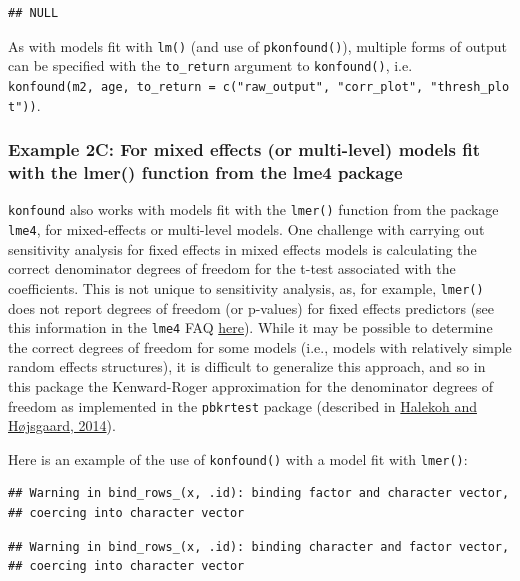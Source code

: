 \documentclass[man]{apa6}
\theoremstyle{definition}
\theoremstyle{definition}
\theoremstyle{definition}
\theoremstyle{remark}
\begin{document}
\begin{verbatim}
## NULL
\end{verbatim}

As with models fit with \texttt{lm()} (and use of \texttt{pkonfound()}),
multiple forms of output can be specified with the \texttt{to\_return}
argument to \texttt{konfound()}, i.e.
\texttt{konfound(m2,\ age,\ to\_return\ =\ c("raw\_output",\ "corr\_plot",\ "thresh\_plot"))}.

\subsubsection{Example 2C: For mixed effects (or multi-level) models fit
with the lmer() function from the lme4
package}\label{example-2c-for-mixed-effects-or-multi-level-models-fit-with-the-lmer-function-from-the-lme4-package}

\texttt{konfound} also works with models fit with the \texttt{lmer()}
function from the package \texttt{lme4}, for mixed-effects or
multi-level models. One challenge with carrying out sensitivity analysis
for fixed effects in mixed effects models is calculating the correct
denominator degrees of freedom for the t-test associated with the
coefficients. This is not unique to sensitivity analysis, as, for
example, \texttt{lmer()} does not report degrees of freedom (or
p-values) for fixed effects predictors (see this information in the
\texttt{lme4} FAQ
\href{http://bbolker.github.io/mixedmodels-misc/glmmFAQ.html\#why-doesnt-lme4-display-denominator-degrees-of-freedomp-values-what-other-options-do-i-have}{here}).
While it may be possible to determine the correct degrees of freedom for
some models (i.e., models with relatively simple random effects
structures), it is difficult to generalize this approach, and so in this
package the Kenward-Roger approximation for the denominator degrees of
freedom as implemented in the \texttt{pbkrtest} package (described in
\href{https://www.jstatsoft.org/htaccess.php?volume=59\&type=i\&issue=09\&paper=true}{Halekoh
and Højsgaard, 2014}).

Here is an example of the use of \texttt{konfound()} with a model fit
with \texttt{lmer()}:

\begin{verbatim}
## Warning in bind_rows_(x, .id): binding factor and character vector,
## coercing into character vector
\end{verbatim}

\begin{verbatim}
## Warning in bind_rows_(x, .id): binding character and factor vector,
## coercing into character vector
\end{verbatim}
\end{document}
